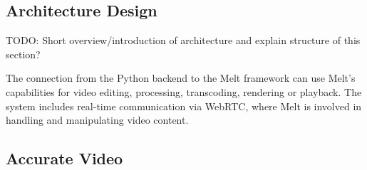 \documentclass[12pt,a4paper]{article}
\begin{document}
\subsection{Architecture Design} \label{subsection:architecturedesign}


TODO: Short overview/introduction of architecture and explain structure of this section?





The connection from the Python backend to the Melt framework can use Melt's capabilities for video editing, processing, transcoding, rendering or playback. The system includes real-time communication via WebRTC, where Melt is involved in handling and manipulating video content.














\subsection{Accurate Video} \label{subsection:accuratevideo}
\end{document}

